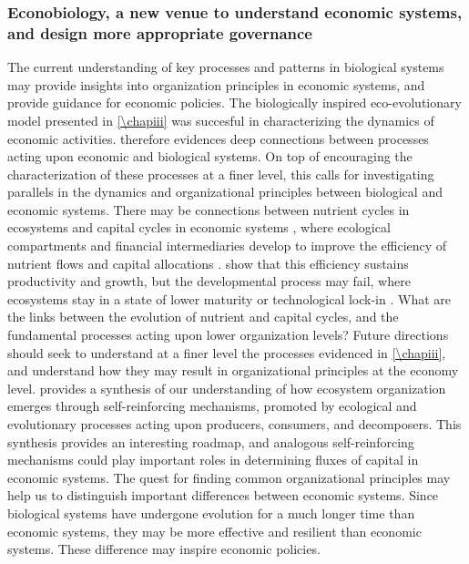 \subsubsection{Econobiology, a new venue to understand economic systems, and design more appropriate governance}

The current understanding of key processes and patterns in biological systems may provide insights into organization principles in economic systems, and provide guidance for economic policies.
% 
The biologically inspired eco-evolutionary model presented in \cref{\chapiii} was succesful in characterizing the dynamics of economic activities. \Cref{\chapiii} therefore evidences deep connections between processes acting upon economic and biological systems. 
% 
On top of encouraging the characterization of these processes at a finer level, this calls for investigating parallels in the dynamics and organizational principles between biological and economic systems.
% 
% 
There may be connections between nutrient cycles in ecosystems \citep{Veldhuis2018} and capital cycles in economic systems \citep{King1993}, where ecological compartments and financial intermediaries develop to improve the efficiency of nutrient flows and capital allocations \citep{Odum1969}.
% 
\cite{Veldhuis2018,King1993} show that this efficiency sustains productivity and growth, but the developmental process may fail, where ecosystems stay in a state of lower maturity \citep{Margalef1963} or technological lock-in \citep{Hidalgo2009}. 
% 
What are the links between the evolution of nutrient and capital cycles, and the fundamental processes acting upon lower organization levels?
% 
% 
Future directions should seek to understand at a finer level the processes evidenced in \cref{\chapiii}, and understand how they may result in organizational principles at the economy level.
% 
\cite{Veldhuis2018} provides a synthesis of our understanding of how ecosystem organization emerges through self-reinforcing mechanisms, promoted by ecological and evolutionary processes acting upon producers, consumers, and decomposers. This synthesis provides an interesting roadmap, and analogous self-reinforcing mechanisms could play important roles in determining fluxes of capital in economic systems. 
% 
The quest for finding common organizational principles may help us to distinguish important differences between economic systems. Since biological systems have undergone evolution for a much longer time than economic systems, they may be more effective and resilient than economic systems. These difference may inspire economic policies.
